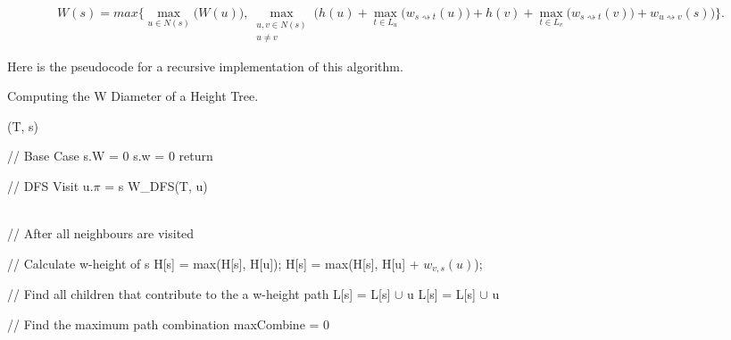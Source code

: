 $$ W(s) = max\Bigg\{ \max\limits_{u \in N(s)}\bigg(W(u)\bigg), \max\limits_{\substack{u, v \in N(s) \\ u \ne v}} \bigg( h(u) + \max\limits_{t \in L_u}\Big(w_{s \rightsquigarrow t}(u)\Big) + h(v) + \max\limits_{t \in L_v}\Big(w_{s \rightsquigarrow t}(v)\Big) + w_{u \rightsquigarrow v}(s) \bigg) \Bigg\}. $$

Here is the pseudocode for a recursive implementation of this algorithm.


\begin{algorithm}{}
\caption{Computing the W Diameter of a Height Tree.}
\begin{algorithmic}[1]

    (T, s)

    \State // Base Case
        \State s.W = 0
        \State s.w = 0
        \State return
    \EndIf


    \State // DFS Visit
            \State u.$\pi$ = s
            \State W\_DFS(T, u)
        \EndIf
    \EndFor

    \\

    \State // After all neighbours are visited

    \State // Calculate w-height of s
            \State H[s] = max(H[s], H[u]);
        \Else
                \State H[s] = max(H[s], H[u] + $w_{v, s}(u)$);
            \EndFor
        \EndIf
    \EndFor

    \State // Find all children that contribute to the a w-height path
            \State L[s] = L[s] $\cup$ u
        \Else
                    \State L[s] = L[s] $\cup$ u
                \EndIf
            \EndFor
        \EndIf

    \EndFor

    \State // Find the maximum path combination
    \State maxCombine = 0



\end{algorithmic}
\end{algorithm}
